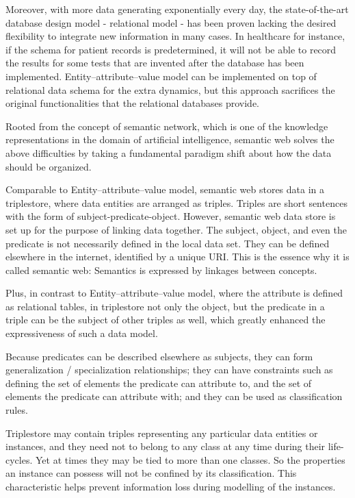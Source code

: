 \documentclass[12pt]{cls}
\begin{document}
Moreover, with more data generating exponentially every day, the state-of-the-art database design model - relational model - has been proven lacking the desired flexibility to integrate new information in many cases. In healthcare for instance, if the schema for patient records is predetermined, it will not be able to record the results for some tests that are invented after the database has been implemented. Entity–attribute–value model can be implemented on top of relational data schema for the extra dynamics, but this approach sacrifices the original functionalities that the relational databases provide.

Rooted from the concept of semantic network, which is one of the knowledge representations in the domain of artificial intelligence, semantic web solves the above difficulties by taking a fundamental paradigm shift about how the data should be organized.

Comparable to Entity–attribute–value model, semantic web stores data in a triplestore, where data entities are arranged as triples. Triples are short sentences with the form of subject-predicate-object. However, semantic web data store is set up for the purpose of linking data together. The subject, object, and even the predicate is not necessarily defined in the local data set. They can be defined elsewhere in the internet, identified by a unique URI. This is the essence why it is called semantic web: Semantics is expressed by linkages between concepts.

Plus, in contrast to Entity–attribute–value model, where the attribute is defined as relational tables, in triplestore not only the object, but the predicate in a triple can be the subject of other triples as well, which greatly enhanced the expressiveness of such a data model.

Because predicates can be described elsewhere as subjects, they can form generalization / specialization relationships; they can have constraints such as defining the set of elements the predicate can attribute to, and the set of elements the predicate can attribute with; and they can be used as classification rules.

Triplestore may contain triples representing any particular data entities or instances, and they need not to belong to any class at any time during their life-cycles. Yet at times they may be tied to more than one classes. So the properties an instance can possess will not be confined by its classification. This characteristic helps prevent information loss during modelling of the instances.
\end{document}
